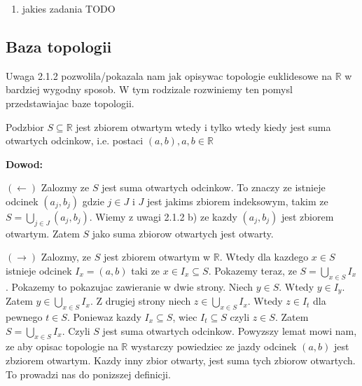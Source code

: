 \documentclass{article}
\begin{document}
\begin{enumerate} %

    \item jakies zadania TODO   


\end{enumerate} %


\subsection{Baza topologii}

Uwaga 2.1.2 pozwolila/pokazala nam jak opisywac topologie euklidesowe na $\mathbb{R}$ w bardziej wygodny sposob. W tym rodzizale rozwiniemy ten pomysl przedstawiajac baze topologii.

\begin{tcolorbox}[colback=white!90!green,colframe=black!35!green,title=2.2.1 Lemat]
    Podzbior $S \subseteq \mathbb{R}$ jest zbiorem otwartym wtedy i tylko wtedy kiedy jest suma otwartych odcinkow, i.e. postaci $(a,b), a,b \in \mathbb{R}$

\end{tcolorbox}

\textbf{Dowod:}

$(\leftarrow)$ Zalozmy ze $S$ jest suma otwartych odcinkow. To znaczy ze istnieje odcinek $(a_{j}, b_{j})$ gdzie $j \in J$ i $J$ jest jakims zbiorem indeksowym, takim ze $S = \bigcup\limits_{j \in J}(a_{j}, b_{j})$. Wiemy z uwagi 2.1.2 b) ze kazdy $(a_{j}, b_{j})$ jest zbiorem otwartym. Zatem $S$ jako suma zbiorow otwartych jest otwarty.

$(\rightarrow)$ Zalozmy, ze $S$ jest zbiorem otwartym w $\mathbb{R}$. Wtedy dla kazdego $x \in S$ istnieje odcinek $I_{x} = (a,b)$ taki ze $x \in I_{x} \subseteq S$. Pokazemy teraz, ze $S = \bigcup\limits_{x \in S}I_{x}$.
Pokazemy to pokazujac zawieranie w dwie strony. 
Niech $y \in S$. Wtedy $y \in I_{y}$. Zatem $y \in \bigcup\limits_{x \in S}I_{x}$. Z drugiej strony niech $z \in \bigcup\limits_{x \in S}I_{x}$. Wtedy $z \in I_{t}$ dla pewnego $t \in S$. Poniewaz kazdy $I_{x} \subseteq S$, wiec $I_{t} \subseteq S$ czyli $z\in S$. Zatem $S = \bigcup\limits_{x \in S}I_{x}$. Czyli $S$ jest suma otwartych odcinkow. 
\vspace{5mm}
Powyzszy lemat mowi nam, ze aby opisac topologie na $\mathbb{R}$ wystarczy powiedziec ze jazdy odcinek $(a,b)$ jest zbziorem otwartym. Kazdy inny zbior otwarty, jest suma tych zbiorow otwartych. To prowadzi nas do ponizszej definicji.
\end{document}
